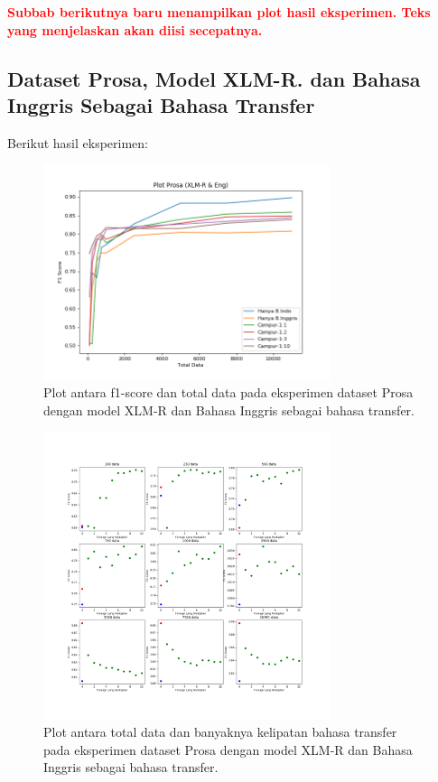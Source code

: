 \textbf{\textcolor{red}{Subbab berikutnya baru menampilkan plot hasil eksperimen. Teks yang menjelaskan akan diisi secepatnya.}}

    \subsection{Dataset Prosa, Model XLM-R. dan Bahasa Inggris Sebagai Bahasa Transfer}
        Berikut hasil eksperimen: 
        \begin{figure}[ht]
            \centering
            \includegraphics[width=0.75\textwidth]{resources/prosa-xlmr-eng-1.png}
            \caption{Plot antara f1-score dan total data pada eksperimen dataset Prosa dengan model XLM-R dan Bahasa Inggris sebagai bahasa transfer.}

            \label{fig:prosa_xlmr_eng_1}
        \end{figure}

        \begin{figure}[ht]
            \centering
            \includegraphics[width=0.75\textwidth]{resources/prosa-xlmr-eng-2.png}
            \caption{Plot antara total data dan banyaknya kelipatan bahasa transfer pada eksperimen dataset Prosa dengan model XLM-R dan Bahasa Inggris sebagai bahasa transfer.}

            \label{fig:prosa_xlmr_eng_2}
        \end{figure}


